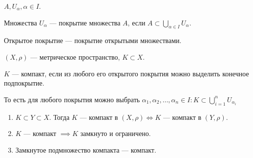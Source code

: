 \begin{definition}
    $A, U_\alpha, \alpha \in I$.

    Множества  $U_\alpha$ --- покрытие множества  $A$, если  $A \subset \bigcup\limits_{\alpha \in I} U_\alpha$.
\end{definition}
\begin{definition}
    Открытое покрытие --- покрытие открытыми множествами.
\end{definition}
\begin{definition}
    $(X, \rho)$ --- метрическое пространство, $K \subset X$.

    $K$ --- компакт, если из любого его открытого покрытия можно выделить конечное подпокрытие. 
\end{definition}
    То есть для любого покрытия можно выбрать $\alpha_1, \alpha_2, \ldots, \alpha_n \in I\!: K \subset\bigcup \limits_{i=1}^n U_{\alpha_i}$
\begin{theorem}
    \begin{enumerate}
        \item $K \subset Y \subset X$. Тогда  $K$ --- компакт в  $(X, \rho) \iff K$ --- компакт в  $(Y, \rho)$.
        \item  $K$ --- компакт  $\implies K$ замкнуто и ограничено.
        \item  Замкнутое подмножество компакта --- компакт.
    \end{enumerate}
\end{theorem}
